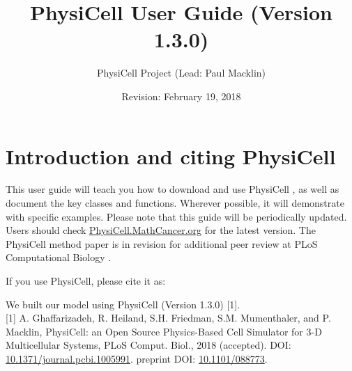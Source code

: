 \documentclass[12pt]{article}
\newcommand{\Version}{1.3.0}
\newcommand{\blue}[1]{\textcolor{blue}{#1}}
\newcommand{\DONE}{}%
\begin{document}
\author{PhysiCell Project (Lead: Paul Macklin)}
\title{PhysiCell User Guide (Version \Version)}
\date{Revision: February 19, 2018}%

\maketitle

\setlength{\parskip}{0in}
\hypertarget{TOC}{}
\tableofcontents
\setlength{\parskip}{8pt}

\section{Introduction and citing PhysiCell \DONE}
This user guide will teach you how to download and use PhysiCell \cite{ref:PhysiCell}, as well as document the key 
classes and functions. Wherever possible, it will demonstrate with specific examples. 
Please note that this guide will be periodically updated.
Users should check \href{http://PhysiCell.MathCancer.org}{PhysiCell.MathCancer.org} for the latest version. 
The PhysiCell method paper is in revision for additional peer review at PLoS Computational Biology \cite{ref:PhysiCell}. 

If you use PhysiCell, please cite it as: 

\hspace{.075\textwidth}\parbox[top]{0.85\textwidth}{%
We built our model using PhysiCell (Version \Version) [1]. \\


[1] A. Ghaffarizadeh, R. Heiland, S.H. Friedman, S.M. Mumenthaler, and P. Macklin, PhysiCell: an Open Source Physics-Based Cell Simulator for 3-D Multicellular Systems, 
PLoS Comput. Biol., 2018 (accepted). DOI: \href{https://dx.doi.org/10.1371/journal.pcbi.1005991}{10.1371/journal.pcbi.1005991}. 
% 
preprint DOI: 
\href{http://dx.doi.org/10.1101/088773}{10.1101/088773}. \\
}



\end{document}
